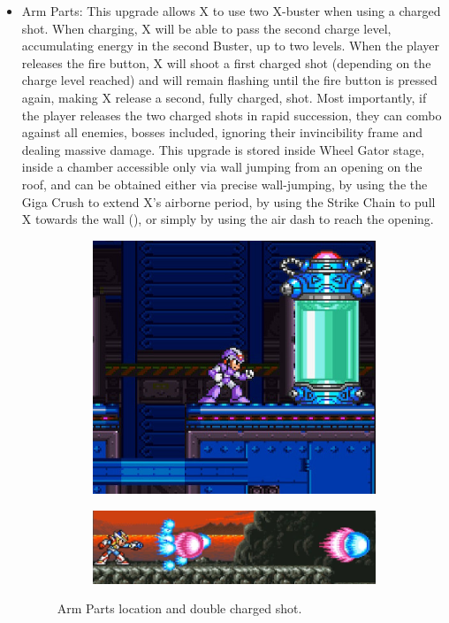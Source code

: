 \begin{itemize}
	
	\item Arm Parts: This upgrade allows X to use two X-buster when using a charged shot. When charging, X will be able to pass the second charge level, accumulating energy in the second Buster, up to two levels.  When the player releases the fire button, X will shoot a first charged shot (depending on the charge level reached) and will remain flashing until the fire button is pressed again, making X release a second, fully charged, shot. Most importantly, if the player releases the two charged shots in rapid succession, they can combo against all enemies, bosses included, ignoring their invincibility frame and dealing massive damage. This upgrade is stored inside Wheel Gator stage, inside a chamber accessible only via wall jumping from an opening on the roof, and can be obtained either via precise wall-jumping, by using the the Giga Crush to extend X's airborne period, by using the Strike Chain to pull X towards the wall (), or simply by using the air dash to reach the opening.
	\begin{figure}[htp]
		\centering
		\begin{subfigure}{0.4\linewidth}
			\centering
			\includegraphics[width=\linewidth]{figures/X2/Wheel_gator/Gator_capsule.jpg}
		\end{subfigure}	
		\begin{subfigure}{0.4\linewidth}	
			\includegraphics[width=\linewidth]{figures/X2/weapons/Double_shot.png}
		\end{subfigure}	
		\caption{Arm Parts location  and double charged shot.}
	\end{figure}
	

\end{itemize}

